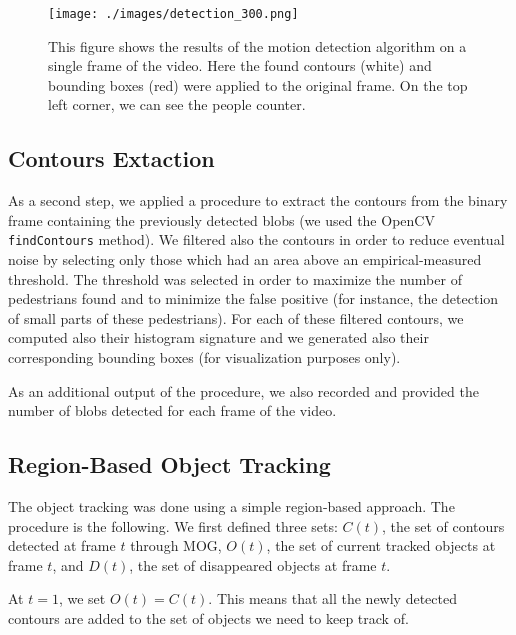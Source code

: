 \documentclass[runningheads]{llncs}
\begin{document}
\begin{figure}
\texttt{[image: ./images/detection\_300.png]}
\caption{This figure shows the results of the motion detection algorithm on a single frame of the video. Here the found contours (white) and bounding boxes (red) were applied to the original frame. On the top left corner, we can see the people counter.}
\label{object_detection_result}
\end{figure}

\subsection{Contours Extaction}
As a second step, we applied a procedure to extract the contours from the binary frame containing the previously detected blobs (we used the OpenCV \texttt{findContours} \cite{findcontours} method). We filtered also the contours in order to reduce eventual noise by selecting only those which had an area above an empirical-measured threshold. The threshold was selected in order to maximize the number of pedestrians found and to minimize the false positive (for instance, the detection of small parts of these pedestrians).  For each of these filtered contours, we computed also their histogram signature and we generated also their corresponding bounding boxes (for visualization purposes only).

As an additional output of the procedure, we also recorded and provided the number of blobs detected for each frame of the video. 

\subsection{Region-Based Object Tracking}

The object tracking was done using a simple region-based approach. The procedure is the following. We first defined three sets: $C(t)$, the set of contours detected at frame $t$ through MOG, $O(t)$, the set of current tracked objects at frame $t$, and $D(t)$, the set of disappeared objects at frame $t$.
\smallskip

At $t=1$,  we set $O(t)=C(t)$. This means that all the newly detected contours are added to the set of objects we need to keep track of.
\smallskip
\end{document}
